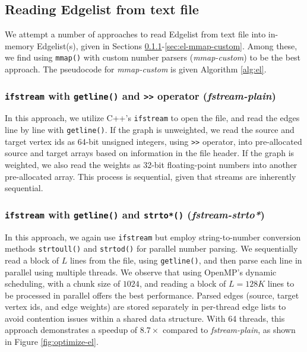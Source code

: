 \subsection{Reading Edgelist from text file}

We attempt a number of approaches to read Edgelist from text file into in-memory Edgelist(s), given in Sections \ref{sec:el-fstream-plain}-\ref{sec:el-mmap-custom}. Among these, we find using \texttt{mmap()} with custom number parsers (\textit{mmap-custom}) to be the best approach. The pseudocode for \textit{mmap-custom} is given Algorithm \ref{alg:el}.


\subsubsection{\texttt{ifstream} with \texttt{getline()} and \texttt{>>} operator (\textit{fstream-plain})}
\label{sec:el-fstream-plain}

In this approach, we utilize C++'s \texttt{ifstream} to open the file, and read the edges line by line with \texttt{getline()}. If the graph is unweighted, we read the source and target vertex ids as 64-bit unsigned integers, using \texttt{>>} operator, into pre-allocated source and target arrays based on information in the file header. If the graph is weighted, we also read the weights as 32-bit floating-point numbers into another pre-allocated array. This process is sequential, given that streams are inherently sequential.


\subsubsection{\texttt{ifstream} with \texttt{getline()} and \texttt{strto*()} (\textit{fstream-strto*})}
\label{sec:el-fstream-stro*}

In this approach, we again use \texttt{ifstream} but employ string-to-number conversion methods \texttt{strtoull()} and \texttt{strtod()} for parallel number parsing. We sequentially read a block of $L$ lines from the file, using \texttt{getline()}, and then parse each line in parallel using multiple threads. We observe that using OpenMP's dynamic scheduling, with a chunk size of $1024$, and reading a block of $L=128K$ lines to be processed in parallel offers the best performance. Parsed edges (source, target vertex ids, and edge weights) are stored separately in per-thread edge lists to avoid contention issues within a shared data structure. With 64 threads, this approach demonstrates a speedup of $8.7\times$ compared to \textit{fstream-plain}, as shown in Figure \ref{fig:optimize-el}.

